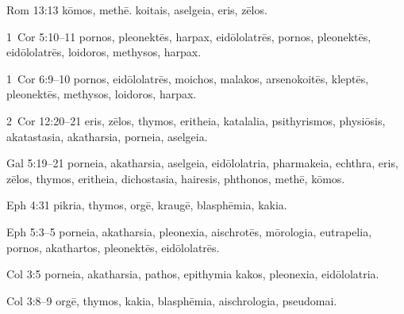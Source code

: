 Rom 13:13 \gls{kōmos}, \gls{methē}. \gls{koitais}, \gls{aselgeia}, \gls{eris}, \gls{zēlos}. 

1~Cor 5:10--11 \gls{pornos}, \gls{pleonektēs}, \gls{harpax}, \gls{eidōlolatrēs}, %
\gls{pornos}, \gls{pleonektēs}, \gls{eidōlolatrēs}, \gls{loidoros}, \gls{methysos}, \gls{harpax}. %
 
1~Cor 6:9--10  \gls{pornos}, \gls{eidōlolatrēs}, \gls{moichos}, \gls{malakos}, \gls{arsenokoitēs}, %
\gls{kleptēs}, \gls{pleonektēs}, \gls{methysos},  \gls{loidoros}, \gls{harpax}. %

2~Cor 12:20--21 \gls{eris}, \gls{zēlos}, \gls{thymos}, \gls{eritheia}, \gls{katalalia}, \gls{psithyrismos}, \gls{physiōsis}, \gls{akatastasia}, %
\gls{akatharsia}, \gls{porneia}, \gls{aselgeia}. %

Gal 5:19--21 \gls{porneia}, \gls{akatharsia}, \gls{aselgeia}, %
\gls{eidōlolatria}, \gls{pharmakeia}, \gls{echthra}, \gls{eris}, \gls{zēlos}, \gls{thymos}, \gls{eritheia}, \gls{dichostasia}, \gls{hairesis}, %
\gls{phthonos}, \gls{methē}, \gls{kōmos}. %

Eph 4:31 \gls{pikria}, \gls{thymos}, \gls{orgē}, \gls{kraugē}, \gls{blasphēmia}, \gls{kakia}. %

Eph 5:3--5 \gls{porneia}, \gls{akatharsia}, \gls{pleonexia}, %
\gls{aischrotēs}, \gls{mōrologia}, \gls{eutrapelia}, %
\gls{pornos}, \gls{akathartos}, \gls{pleonektēs}, \gls{eidōlolatrēs}. %

Col 3:5 \gls{porneia}, \gls{akatharsia}, \gls{pathos}, \gls{epithymia kakos}, \gls{pleonexia}, \gls{eidōlolatria}. %

Col 3:8--9 \gls{orgē}, \gls{thymos}, \gls{kakia}, \gls{blasphēmia}, \gls{aischrologia}, %
\gls{pseudomai}. %

